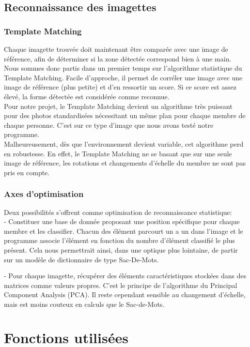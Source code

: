 \documentclass[10pt,a4paper]{report}
\begin{document}
\subsection{Reconnaissance des imagettes}
\subsubsection*{Template Matching}
Chaque imagette trouvée doit maintenant être comparée avec une image de référence, afin de déterminer si la zone détectée correspond bien à une main. Nous sommes donc partis dans un premier temps sur l'algorithme statistique du Template Matching. Facile d'approche, il permet de corréler une image avec une image de référence (plus petite) et d'en ressortir un score. Si ce score est assez élevé, la forme détectée est considérée comme reconnue.\\
Pour notre projet, le Template Matching devient un algorithme très puissant pour des photos standardisées nécessitant un même plan pour chaque membre de chaque personne. C'est sur ce type d'image que nous avons testé notre programme.\\
Malheureusement, dès que l'environnement devient variable, cet algorithme perd en robustesse. En effet, le Template Matching ne se basant que sur une seule image de référence, les rotations et changements d'échelle du membre ne sont pas pris en compte.
\subsubsection*{Axes d'optimisation}
Deux possibilités s'offrent comme optimisation de reconnaissance statistique:\\

- Constituer une base de donnée proposant une position spécifique pour chaque membre et les classifier. Chacun des élément parcourt un a un dans l'image et le programme associe l'élément en fonction du nombre d'élément classifié le plus présent. Cela nous permettrait ainsi, dans une optique plus lointaine, de partir sur un modèle de dictionnaire de type Sac-De-Mots.

- Pour chaque imagette, récupérer des éléments caractéristiques stockées dans des matrices comme valeurs propres. C'est le principe de l'algorithme du Principal Component Analysis (PCA). Il reste cependant sensible au changement d'échelle, mais est moins couteux en calculs que le Sac-de-Mots.


\section{Fonctions utilisées}
\end{document}

